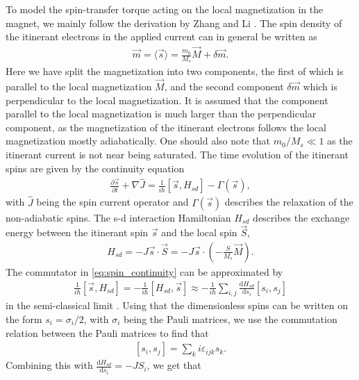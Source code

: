 \documentclass[12pt, a4paper]{article}		%
\numberwithin{equation}{section}
\begin{document}
To model the spin-transfer torque acting on the local magnetization in the magnet, we mainly follow the derivation by Zhang and Li \cite{ZhangLi-04}. The spin density of the itinerant electrons in the applied current can in general be written as
\begin{align}
\label{eq:mag_current}
\vec{m} = \langle \vec{s} \rangle = \frac{m_0}{M_s}\vec{M} + \delta\vec{m}.
\end{align}
Here we have split the magnetization into two components, the first of which is parallel to the local magnetization $\vec{M}$, and the second component $\delta\vec{m}$ which  is perpendicular to the local magnetization. It is assumed that the component parallel to the local magnetization is much larger than the perpendicular component, as the magnetization of the itinerant electrons follows the local magnetization mostly adiabatically. One should also note that $m_0/M_s \ll 1$ as the itinerant current is not near being saturated. The time evolution of the itinerant spins are given by the continuity equation
\begin{align}
\label{eq:spin_continuity}
\frac{\partial \vec{s}}{\partial t} + \nabla \hat{J} = \frac{1}{i\hbar} \left[ \vec{s}, H_{sd} \right] - \Gamma(\vec{s}),
\end{align}
with $\hat{J}$ being the spin current operator and $\Gamma(\vec{s})$ describes the relaxation of the non-adiabatic spins. The s-d interaction Hamiltonian $H_{sd}$ describes the exchange energy between the itinerant spin $\vec{s}$ and the local spin $\vec{S}$,
\begin{align}
H_{sd} = -J \vec{s} \cdot \vec{S} = -J \vec{s} \cdot (-\frac{S}{M_s} \vec{M}).
\end{align}
The commutator in \eqref{eq:spin_continuity} can be approximated by
\begin{align}
\frac{1}{i\hbar} \left[ \vec{s}, H_{sd} \right] = - \frac{1}{i\hbar} \left[ H_{sd}, \vec{s} \right] \approx -\frac{1}{i\hbar}\sum_{i, j} \frac{\textrm{d} H_{sd}}{\textrm{d} s_i}\left[ s_i, s_j \right]
\end{align}
in the semi-classical limit \citep{kruger2006current}. Using that the dimensionless spins can be written on the form $s_i = \sigma_i/2$, with $\sigma_i$ being the Pauli matrices, we use the commutation relation between the Pauli matrices to find that
\begin{align}
\left[ s_i, s_j \right] = \sum_k i\varepsilon_{ijk} s_k.
\end{align}
Combining this with $\frac{\textrm{d} H_{sd}}{\textrm{d} s_i} = -JS_i$, we get that
\end{document}
